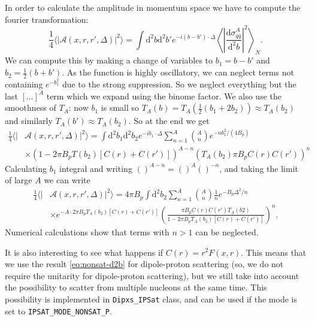 \documentclass[a4paper,12pt]{article}
\newcommand{\code}[1]{\texttt{#1}}
\newcommand{\der}{\mathrm{d}}
\newcommand{\A}{\mathcal{A}}
\begin{document}
In order to calculate the amplitude in momentum space we have to compute the fourier transformation:
\begin{equation}
	\frac{1}{4} \langle |\A(x,r,r',\Delta)|^2 \rangle = \int \der^2 b \der^2 b' e^{-i(b-b')\cdot \Delta} \left \langle \left| \frac{\der \sigma_{q\bar q}^A}{\der^2 b} \right|^2 \right \rangle_N.
\end{equation}
We can compute this by making a change of variables to $b_1 = b-b'$ and $b_2 = \frac{1}{2}(b+b')$. As the function is highly oscillatory, we can neglect terms not containing $e^{-b_1^2}$ due to the strong suppression. So we neglect everything but the last $[\dots ]^A$ term which we expand using the binome factor. We also use the smoothness of $T_A$: now $b_1$ is small so $T_A(b)=T_A(\frac{1}{2}(b_1+2b_2)) \approx T_A(b_2)$ and similarly $T_A(b')\approx T_A(b_2)$. So at the end we get
\begin{equation}
\begin{split}
	\frac{1}{4} \langle |&\A(x,r,r',\Delta)|^2 \rangle = \int \der^2 b_1 \der^2 b_2 e^{-ib_1 \cdot \Delta} \sum_{n=1}^A \binom{A}{n} e^{-nb_1^2/(4B_p)}  \\
	& \times \left(1-2\pi B_p T(b_2)[C(r)+C(r')] \right)^{A-n} \left( T_A(b_2)\pi B_p C(r)C(r') \right)^n 
\end{split}
\end{equation}
Calculating $b_1$ integral and writing $()^{A-n} = ()^A ()^{-n}$, and taking the limit of large $A$ we can write
\begin{equation}
\begin{split}
	\frac{1}{4} \langle |&\A(x,r,r',\Delta)|^2 \rangle = 4\pi B_p \int \der^2 b_2  \sum_{n=1}^A \binom{A}{n} \frac{1}{n} e^{-B_p\Delta^2/n}  \\
	&\times e^{-A\cdot 2\pi B_p T_A(b_2)[C(r)+C(r')]} \left( \frac{\pi B_p C(r)C(r')T_A(b2)}{1-2\pi B_p T_A(b_2) [ C(r)+C(r')]} \right)^n.
\end{split}
\end{equation}
Numerical calculations show that terms with $n>1$ can be neglected.

It is also interesting to see what happens if $C(r)=r^2F(x,r)$. This means that we use the result \eqref{eq:nonsat-d2b} for dipole-proton scattering (so, we do not require the unitarity for dipole-proton scattering), but we still take into account the possibility to scatter from multiple nucleons at the same time. This possibility is implemented in \code{Dipxs\_IPSat} class, and can be used if the mode is set to \code{IPSAT\_MODE\_NONSAT\_P}.
\end{document}
